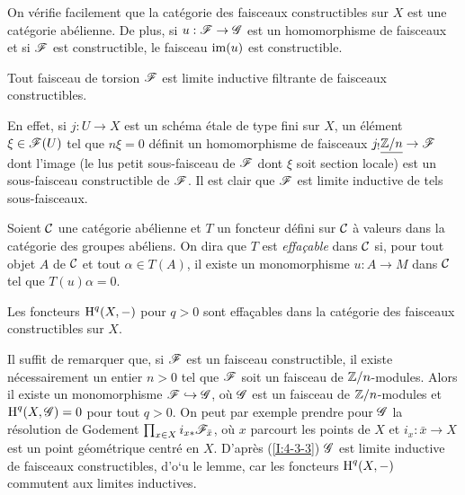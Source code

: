 \documentclass[oneside]{book}
\begin{document}
On vérifie facilement que la catégorie des faisceaux constructibles sur $X$ 
est une catégorie abélienne. De plus, si $u:\mathscr{F}\to \mathscr{G}$ est un homomorphisme de 
faisceaux et si $\mathscr{F}$ est constructible, le faisceau $\operatorname{im}(u)$ est constructible.





\begin{lemma}\label{I:4-3-3}
Tout faisceau de torsion $\mathscr{F}$ est limite inductive filtrante de faisceaux 
constructibles.
\end{lemma}

En effet, si $j:U\to X$ est un schéma étale de type fini sur $X$, un 
élément $\xi\in \mathscr{F}(U)$ tel que $n\xi=0$ définit un homomorphisme de 
faisceaux $j_! \underline{\mathbb{Z}/n}\to \mathscr{F}$ dont l'image (le lus petit sous-faisceau de 
$\mathscr{F}$ dont $\xi$ soit section locale) est un sous-faisceau constructible de $\mathscr{F}$. 
Il est clair que $\mathscr{F}$ est limite inductive de tels sous-faisceaux.





\begin{definition}\label{I:4-3-4}
Soient $\mathcal{C}$ une catégorie abélienne et $T$ un foncteur défini sur $\mathcal{C}$ 
à valeurs dans la catégorie des groupes abéliens. On dira que $T$ est 
\emph{effaçable} dans $\mathcal{C}$ si, pour tout objet $A$ de $\mathcal{C}$ et tout 
$\alpha\in T(A)$, il existe un monomorphisme $u:A\to M$ dans $\mathcal{C}$ tel que 
$T(u)\alpha = 0$. 
\end{definition}





\begin{lemma}\label{I:4-3-5}
Les foncteurs $\operatorname{H}^q(X,-)$ pour $q>0$ sont effaçables dans la catégorie des 
faisceaux constructibles sur $X$.
\end{lemma}

Il suffit de remarquer que, si $\mathscr{F}$ est un faisceau constructible, il existe 
nécessairement un entier $n>0$ tel que $\mathscr{F}$ soit un faisceau de 
$\mathbb{Z}/n$-modules. Alors il existe un monomorphisme $\mathscr{F}\hookrightarrow \mathscr{G}$, où 
$\mathscr{G}$ est un faisceau de $\mathbb{Z}/n$-modules et $\operatorname{H}^q(X,\mathscr{G}) = 0$ pour tout $q>0$.  
On peut par exemple prendre pour $\mathscr{G}$ la résolution de Godement 
$\prod_{x\in X} i_{x*} \mathscr{F}_{\bar x}$, où $x$ parcourt les points de $X$ et 
$i_x:\bar x\to X$ est un point géométrique centré en $X$. D'après 
(\ref{I:4-3-3}) $\mathscr{G}$ est limite inductive de faisceaux constructibles, d'o`u le 
lemme, car les foncteurs $\operatorname{H}^q(X,-)$ commutent aux limites inductives. 
\end{document}
